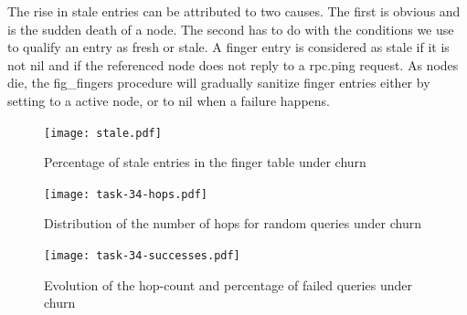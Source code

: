 \documentclass[11pt,a4paper]{scrartcl}
\begin{document}
The rise in stale entries can be attributed to two causes.
The first is obvious and is the sudden death of a node.
The second has to do with the conditions we use to qualify an entry as fresh or stale.
A finger entry is considered as stale if it is not \textsf{nil} and if the referenced node does not reply to a \textsf{rpc.ping} request.
As nodes die, the \textsf{fig_fingers} procedure will gradually sanitize finger entries either by setting to a active node, or to \textsf{nil} when a failure happens.

\begin{figure}
	\centering
	\texttt{[image: stale.pdf]}
	\caption{Percentage of stale entries in the finger table under churn}
	\label{fig:stale}
\end{figure}

\begin{figure}
	\centering
	\texttt{[image: task-34-hops.pdf]}
	\caption{Distribution of the number of hops for random queries under churn}
	\label{fig:34-hops}
\end{figure}

\begin{figure}
	\centering
	\texttt{[image: task-34-successes.pdf]}
	\caption{Evolution of the hop-count and percentage of failed queries under churn}
	\label{fig:34-successes}
\end{figure}
\end{document}

